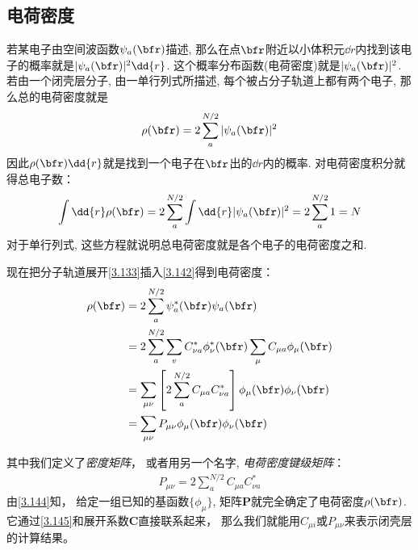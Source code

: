 \subsection{电荷密度}
若某电子由空间波函数$\psi_a(\bfr)$描述, 
那么在点$\bfr$附近以小体积元$\dd{r}$内找到该电子的概率就是$|\psi_a(\bfr)|^2\dd{r}$. 
这个概率分布函数(电荷密度)就是$|\psi_a(\bfr)|^2$. 
若由一个闭壳层分子, 
由一单行列式所描述, 
每个被占分子轨道上都有两个电子, 
那么总的电荷密度就是
\begin{align}
	\label{3.142}
	\rho(\bfr) = 2 \sum_{a}^{N/2} |\psi_a(\bfr)|^2
\end{align}
因此$\rho(\bfr)\dd{r}$就是找到一个电子在$\bfr$出的$\dd{r}$内的概率. 
对电荷密度积分就得总电子数：
\begin{align}
	\int\dd{r}\rho(\bfr) = 2 \sum_{a}^{N/2} \int\dd{r}|\psi_a(\bfr)|^2 = 2\sum_{a}^{N/2}1=N
\end{align}
对于单行列式, 
这些方程就说明总电荷密度就是各个电子的电荷密度之和.


现在把分子轨道展开\autoref{3.133}插入\autoref{3.142}得到电荷密度：
\begin{align}
	\rho(\bfr) & = 2\sum_{a}^{N/2}\psi_a^*(\bfr)\psi_a(\bfr) \notag\\
	& = 2\sum_{a}^{N/2}\sum_{v} C_{\nu a}^*\phi_\nu^*(\bfr)\sum_{\mu}C_{\mu a}\phi_\mu(\bfr) \notag\\
	& = \sum_{\mu\nu}\left[ 2\sum_{a}^{N/2}C_{\mu a}C_{\nu a}^* \right]\phi_\mu(\bfr)\phi_\nu(\bfr) \notag\\
	& = \sum_{\mu\nu}P_{\mu\nu} \phi_\mu(\bfr)\phi_\nu(\bfr)
	\label{3.144}
\end{align}

其中我们定义了\emph{密度矩阵}，
或者用另一个名字, 
\emph{电荷密度键级矩阵}：
\begin{align}
	P_{\mu\nu} = 2\sum_{a}^{N/2}C_{\mu a}C_{\nu a}^*
	\label{3.145}
\end{align}
由\autoref{3.144}知，
给定一组已知的基函数$\{\phi_\mu\}$, 
矩阵$\mathbf{P}$就完全确定了电荷密度$\rho(\bfr)$. 
它通过\autoref{3.145}和展开系数$\mathbf{C}$直接联系起来，
那么我们就能用$C_{\mu i}$或$P_{\mu\nu}$来表示闭壳层\hft 的计算结果。



